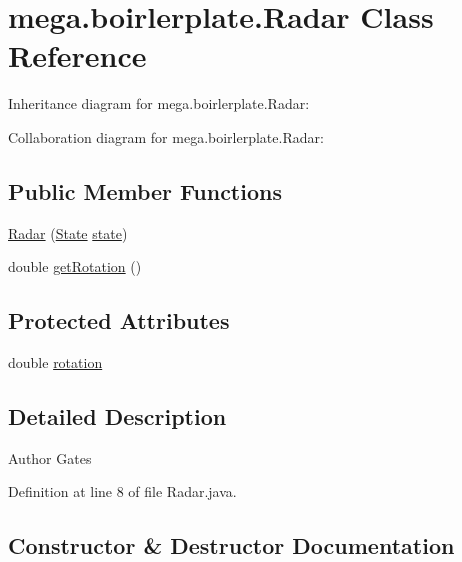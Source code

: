\hypertarget{classmega_1_1boirlerplate_1_1_radar}{}\section{mega.\+boirlerplate.\+Radar Class Reference}
\label{classmega_1_1boirlerplate_1_1_radar}


Inheritance diagram for mega.\+boirlerplate.\+Radar\+:


Collaboration diagram for mega.\+boirlerplate.\+Radar\+:
\subsection*{Public Member Functions}
\begin{DoxyCompactItemize}
\item 
\hyperlink{classmega_1_1boirlerplate_1_1_radar_a73ddbb7f491d0ba8353eb2a387a5fa55}{Radar} (\hyperlink{classmega_1_1boirlerplate_1_1_state}{State} \hyperlink{classmega_1_1boirlerplate_1_1_component_a87b0d70f323b5fee60a200e07c9c20fd}{state})
\item 
double \hyperlink{classmega_1_1boirlerplate_1_1_radar_ab1570cfd91730f9c0e3fe160ff182310}{get\+Rotation} ()
\end{DoxyCompactItemize}
\subsection*{Protected Attributes}
\begin{DoxyCompactItemize}
\item 
double \hyperlink{classmega_1_1boirlerplate_1_1_radar_a1667df6cb84933a744aa36582cc4dd28}{rotation}
\end{DoxyCompactItemize}


\subsection{Detailed Description}
\begin{DoxyAuthor}{Author}
Gates 
\end{DoxyAuthor}


Definition at line 8 of file Radar.\+java.



\subsection{Constructor \& Destructor Documentation}
\mbox{\label{classmega_1_1boirlerplate_1_1_radar_a73ddbb7f491d0ba8353eb2a387a5fa55}} 
